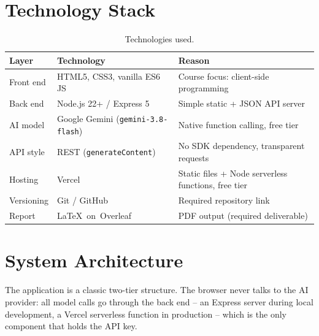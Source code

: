\documentclass[11pt,a4paper]{article}
\begin{document}
\section{Technology Stack}

\begin{table}[h]
\centering
\caption{Technologies used.}
\begin{tabular}{@{}llp{6cm}@{}}
\toprule
\textbf{Layer} & \textbf{Technology} & \textbf{Reason} \\
\midrule
Front end   & HTML5, CSS3, vanilla ES6 JS & Course focus: client-side programming \\
Back end    & Node.js 22+ / Express 5     & Simple static + JSON API server \\
AI model    & Google Gemini (\texttt{gemini-3.8-flash}) & Native function calling, free tier \\
API style   & REST (\texttt{generateContent}) & No SDK dependency, transparent requests \\
Hosting     & Vercel                       & Static files + Node serverless functions, free tier \\
Versioning  & Git / GitHub                 & Required repository link \\
Report      & \LaTeX~on~Overleaf & PDF output (required deliverable) \\
\bottomrule
\end{tabular}
\end{table}

\section{System Architecture}

The application is a classic two-tier structure. The browser never talks to the AI provider:
all model calls go through the back end -- an Express server during local development, a Vercel
serverless function in production -- which is the only component that holds the API key.
\end{document}
